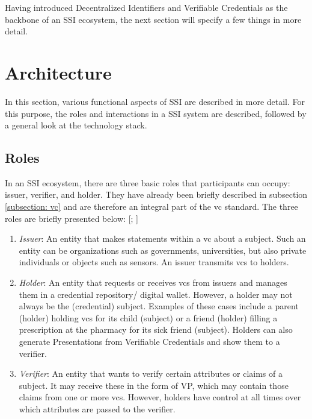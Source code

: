         Having introduced Decentralized Identifiers and Verifiable Credentials as the backbone of an \ac{SSI} ecosystem, the next section will specify a few things in more detail.
	   
    \section{Architecture}
        In this section, various functional aspects of \ac{SSI} are described in more detail. For this purpose, the roles and interactions in a \ac{SSI} system are described, followed by a general look at the technology stack.
        
    	\subsection{Roles}\label{subsection: vc roles}
    	
    	In an SSI ecosystem, there are three basic roles that participants can occupy: issuer, verifier, and holder. They have already been briefly described in subsection \ref{subsection: vc} and are therefore an integral part of the \ac{vc} standard. The three roles are briefly presented below: [\citealp[pp. 25-26]{preukschat_self-sovereign_2021}; \citealp{sporny_verifiable_2019}]
    	
    	\begin{enumerate}
        	\item \textit{Issuer}: An entity that makes statements within a \ac{vc} about a subject. Such an entity can be organizations such as governments, universities, but also private individuals or objects such as sensors. An issuer transmits \acp{vc} to holders.
        	\item \textit{Holder}: An entity that requests or receives \acp{vc} from issuers and manages them in a credential repository/ digital wallet. However, a holder may not always be the (credential) subject. Examples of these cases include a parent (holder) holding \acp{vc} for its child (subject) or a friend (holder) filling a prescription at the pharmacy for its sick friend (subject). Holders can also generate Presentations from Verifiable Credentials and show them to a verifier.  
        	\item \textit{Verifier}: An entity that wants to verify certain attributes or claims of a subject. It may receive these in the form of \ac{VP}, which may contain those claims from one or more \acp{vc}. However, holders have control at all times over which attributes are passed to the verifier.
        \end{enumerate}
        
